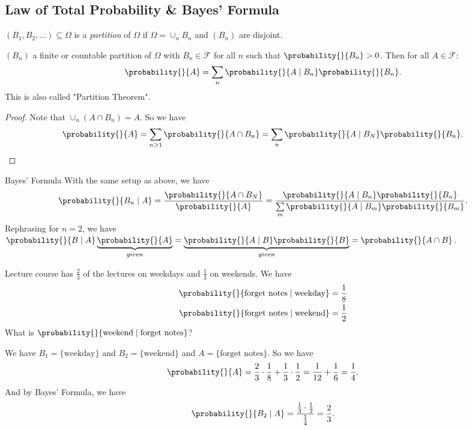 \subsection{Law of Total Probability \& Bayes' Formula}
\leavevmode
\begin{definition}{}{}
    \((B_1, B_2, \ldots) \subseteq \Omega\) is a \textit{partition} of \(\Omega\) if \(\Omega = \cup_n B_n\) and \((B_n)\) are disjoint.
\end{definition}
\begin{theorem}{}{}
    \((B_n)\) a finite or countable partition of \(\Omega\) with \(B_n \in \mathcal{F} \) for all \(n\) such that \(\probability{}{B_n} >0\). Then for all \(A \in \mathcal{F} \):
    \[
        \probability{}{A} = \sum\limits_{n}\probability{}{A\mid B_n} \probability{}{B_n} .
    \]
    This is also called "Partition Theorem".
\end{theorem}
\begin{proof}
    Note that \(\cup_n (A\cap B_n) = A\). So we have
    \[
        \probability{}{A} = \sum\limits_{n\geq 1}\probability{}{A\cap B_n} = \sum\limits_{n} \probability{}{A\mid B_N} \probability{}{B_n}.
    \]
\end{proof}
\begin{theorem}{Bayes' Formula}{}
    With the same setup as above, we have
    \[
        \probability{}{B_n \mid A} = \frac{\probability{}{A \cap B_N}}{\probability{}{A} }= \frac{\probability{}{A\mid B_n} \probability{}{B_n} }{\sum\limits_{m}\probability{}{A\mid B_m} \probability{}{B_m} }.
    \]
    Rephrasing for \(n = 2\), we have \(\probability{}{B \mid A} \underbrace{\probability{}{A}}_{given} = \underbrace{\probability{}{A \mid B} \probability{}{B}}_{given} = \probability{}{A\cap B}\).
\end{theorem}
\begin{example}
    Lecture course has \(\frac{2}{3}\) of the lectures on weekdays and \(\frac{1}{3}\) on weekends. We have
    \begin{align*}
        \probability{}{\text{forget notes}\mid \text{weekday}} &= \frac{1}{8}\\ 
        \probability{}{\text{forget notes}\mid \text{weekend}} &= \frac{1}{2}
    \end{align*}
    What is \(\probability{}{\text{weekend}\mid \text{forget notes}} \)?

    We have \(B_1 = \{\text{weekday}\}\) and \(B_2 = \{\text{weekend}\}\) and \(A = \{\text{forget notes}\}\). So we have
    \[
        \probability{}{A} = \frac{2}{3}\cdot\frac{1}{8}+\frac{1}{3}\cdot\frac{1}{2} = \frac{1}{12} + \frac{1}{6}=\frac{1}{4}.
    \]
    And by Bayes' Formula, we have
    \[
        \probability{}{B_2 \mid A} = \frac{\frac{1}{3}\cdot \frac{1}{2}}{\frac{1}{4}} = \frac{2}{3}.
    \]
\end{example}
